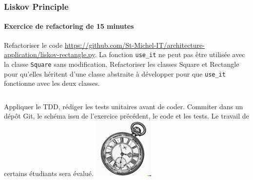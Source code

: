 \documentclass{beamer}
\begin{document}
    \begin{frame}
        \transdissolve
        \frametitle{Liskov Principle}
        \framesubtitle{Exercice \execcounterdispinc{} de refactoring de 15 minutes}
        Refactoriser le code \url{https://github.com/St-Michel-IT/architecture-application/liskov-rectangle.py}.
        La fonction \lstinline{use_it} ne peut pas être utilisée avec la classe \lstinline{Square} sans modification.
        Refactoriser les classes {Square} et {Rectangle} pour qu'elles héritent d'une classe abstraite à développer pour que \lstinline{use_it} fonctionne avec les deux classes.
        \bigbreak
        \begin{columns}
            Appliquer le TDD, rédiger les tests unitaires avant de coder.
            \bigbreak
            Commiter dans un dépôt Git, le schéma issu de l'exercice précédent, le code et les tests.
            \bigbreak
            Le travail de certains étudiants sera évalué.
            \centering
            \includegraphics[width=3cm]{image/engraving-of-an-old-watch}
        \end{columns}
    \end{frame}
\end{document}
